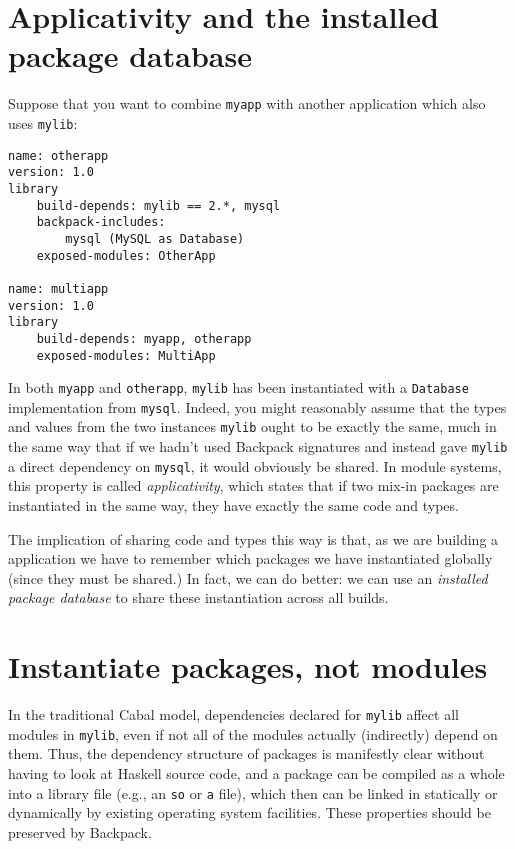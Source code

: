 
\section{Applicativity and the installed package database}

Suppose that you want to combine \verb|myapp| with another application
which also uses \verb|mylib|:

\begin{verbatim}
name: otherapp
version: 1.0
library
    build-depends: mylib == 2.*, mysql
    backpack-includes:
        mysql (MySQL as Database)
    exposed-modules: OtherApp

name: multiapp
version: 1.0
library
    build-depends: myapp, otherapp
    exposed-modules: MultiApp
\end{verbatim}

In both \verb|myapp| and \verb|otherapp|, \verb|mylib| has been
instantiated with a \verb|Database| implementation from \verb|mysql|.
Indeed, you might reasonably assume that the types and values from the
two instances \verb|mylib| ought to be exactly the same, much in the
same way that if we hadn't used Backpack signatures and instead gave
\verb|mylib| a direct dependency on \verb|mysql|, it would obviously be
shared.  In module systems, this property is called
\emph{applicativity}, which states that if two mix-in packages are
instantiated in the same way, they have exactly the same code and types.

The implication of sharing code and types this way is that, as we
are building a application we have to remember which packages we have
instantiated globally (since they must be shared.)  In fact, we can
do better: we can use an \emph{installed package database} to share
these instantiation across all builds.

\section{Instantiate packages, not modules}
\label{sec:instantiate-pkgs}

In the traditional Cabal model, dependencies declared for \verb|mylib|
affect all modules in \verb|mylib|, even if not all of the modules
actually (indirectly) depend on them.  Thus, the dependency structure of
packages is manifestly clear without having to look at Haskell source
code, and a package can be compiled as a whole into a library file
(e.g., an \verb|so| or \verb|a| file), which then can be linked in
statically or dynamically by existing operating system facilities.
These properties should be preserved by Backpack.

